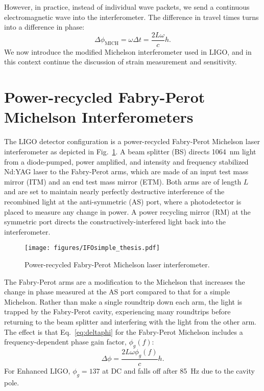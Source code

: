 However, in practice, instead of individual wave packets, we send a
continuous electromagnetic wave into the interferometer. The
difference in travel times turns into a difference in phase:
\begin{equation}
\Delta \phi_{\mathrm{MICH}} = \omega \Delta t = \frac{2 L \omega}{c} h.
\label{eq:deltaphi}
\end{equation}
We now introduce the modified Michelson interferometer used in LIGO,
and in this context continue the discussion of strain measurement and
sensitivity.




\section{Power-recycled Fabry-Perot Michelson Interferometers} 
The LIGO detector configuration is a power-recycled Fabry-Perot
Michelson laser interferometer as depicted in
Fig.~\ref{fig:IFOschematic}. A beam splitter (BS) directs 1064~nm
light from a diode-pumped, power amplified, and intensity and
frequency stabilized Nd:YAG laser to the Fabry-Perot arms, which are
made of an input test mass mirror (ITM) and an end test mass mirror
(ETM). Both arms are of length $L$ and are set to maintain nearly
perfectly destructive interference of the recombined light at the
anti-symmetric (AS) port, where a photodetector is placed to measure
any change in power. A power recycling mirror (RM) at the symmetric
port directs the constructively-interfered light back into the
interferometer.

\begin{figure}
\begin{centering}
\texttt{[image: figures/IFOsimple\_thesis.pdf]}
\caption[Power-recycled Fabry-Perot Michelson laser
interferometer]{Power-recycled Fabry-Perot Michelson laser
  interferometer.}
\label{fig:IFOschematic}
\end{centering}
\end{figure}

The Fabry-Perot arms are a modification to the Michelson that
increases the change in phase measured at the AS port compared to that
for a simple Michelson. Rather than make a single roundtrip down each
arm, the light is trapped by the Fabry-Perot cavity, experiencing many
roundtrips before returning to the beam splitter and interfering with
the light from the other arm. The effect is that Eq.~\ref{eq:deltaphi}
for the Fabry-Perot Michelson includes a frequency-dependent phase
gain factor, $\phi_g(f)$:
\begin{equation}
\Delta \phi = \frac{2 L \omega \phi_g(f)}{c} h.
\label{eq:deltaphi}
\end{equation}
For Enhanced LIGO, $\phi_g = 137$ at DC and falls off after 85~Hz due
to the cavity pole.

